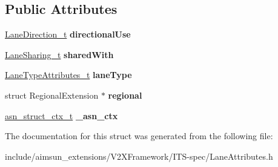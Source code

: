 \subsection*{Public Attributes}
\begin{DoxyCompactItemize}
\item 
\hyperlink{structBIT__STRING__s}{Lane\+Direction\+\_\+t} {\bfseries directional\+Use}\hypertarget{structLaneAttributes_aae14e45b6063541106f5b77ca46d2638}{}\label{structLaneAttributes_aae14e45b6063541106f5b77ca46d2638}

\item 
\hyperlink{structBIT__STRING__s}{Lane\+Sharing\+\_\+t} {\bfseries shared\+With}\hypertarget{structLaneAttributes_ad3e353373420dce878c4bcce5adf0f66}{}\label{structLaneAttributes_ad3e353373420dce878c4bcce5adf0f66}

\item 
\hyperlink{structLaneTypeAttributes}{Lane\+Type\+Attributes\+\_\+t} {\bfseries lane\+Type}\hypertarget{structLaneAttributes_a0c866cb229abd7f6dae5700a2482d40f}{}\label{structLaneAttributes_a0c866cb229abd7f6dae5700a2482d40f}

\item 
struct Regional\+Extension $\ast$ {\bfseries regional}\hypertarget{structLaneAttributes_a14a69de575fef139955de418970c93e9}{}\label{structLaneAttributes_a14a69de575fef139955de418970c93e9}

\item 
\hyperlink{structasn__struct__ctx__s}{asn\+\_\+struct\+\_\+ctx\+\_\+t} {\bfseries \+\_\+asn\+\_\+ctx}\hypertarget{structLaneAttributes_a43285e66921d0f1ee320278cb048f12a}{}\label{structLaneAttributes_a43285e66921d0f1ee320278cb048f12a}

\end{DoxyCompactItemize}


The documentation for this struct was generated from the following file\+:\begin{DoxyCompactItemize}
\item 
include/aimsun\+\_\+extensions/\+V2\+X\+Framework/\+I\+T\+S-\/spec/Lane\+Attributes.\+h\end{DoxyCompactItemize}
